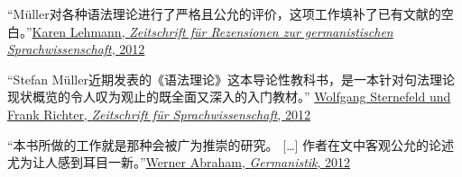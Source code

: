 {\smallskip

\vfill

“Müller对各种语法理论进行了严格且公允的评价，这项工作填补了已有文献的空白。”\href{http://dx.doi.org/10.1515/zrs-2012-0040}{Karen Lehmann, \textit{Zeitschrift für Rezensionen zur germanistischen Sprachwissenschaft}, 2012}


\smallskip

“Stefan Müller近期发表的《语法理论》这本导论性教科书，是一本针对句法理论现状概览的令人叹为观止的既全面又深入的入门教材。” \href{http://dx.doi.org/10.1515/zfs-2012-0010}{Wolfgang Sternefeld und Frank Richter, \textit{Zeitschrift für Sprachwissenschaft}, 2012}


\smallskip

“本书所做的工作就是那种会被广为推崇的研究。 [\dots] 作者在文中客观公允的论述尤为让人感到耳目一新。”\href{http://dx.doi.org/10.1515/germ-2011-537}{Werner Abraham, \textit{Germanistik}, 2012}

}
\dedication{献给Max}
\renewcommand{\lsISBNdigital}{??}
\renewcommand{\lsISBNhardcoverOne}{??}
\renewcommand{\lsISBNhardcoverTwo}{??}
\renewcommand{\lsISBNsoftcoverOne}{??}
\renewcommand{\lsISBNsoftcoverTwo}{??}
\renewcommand{\lsSeries}{tbls} %
\renewcommand{\lsSeriesNumber}{??} %
\renewcommand{\lsURL}{http://langsci-press.org/catalog/book/177} %


